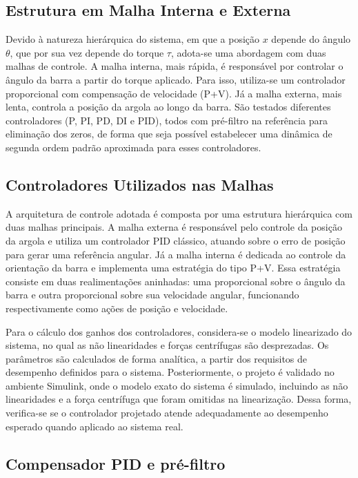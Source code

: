 \documentclass[a4paper, 12pt]{article} %
\begin{document}
\subsection{Estrutura em Malha Interna e Externa}
Devido à natureza hierárquica do sistema, em que a posição \( x \) depende do ângulo \( \theta \), que por sua vez depende do torque \( \tau \), adota-se uma abordagem com duas malhas de controle. A malha interna, mais rápida, é responsável por controlar o ângulo da barra a partir do torque aplicado. Para isso, utiliza-se um controlador proporcional com compensação de velocidade (P+V). Já a malha externa, mais lenta, controla a posição da argola ao longo da barra. São testados diferentes controladores (P, PI, PD, DI e PID), todos com pré-filtro na referência para eliminação dos zeros, de forma que seja possível estabelecer uma dinâmica de segunda ordem padrão aproximada para esses controladores.

\subsection{Controladores Utilizados nas Malhas}

A arquitetura de controle adotada é composta por uma estrutura hierárquica com duas malhas principais. A malha externa é responsável pelo controle da posição da argola e utiliza um controlador PID clássico, atuando sobre o erro de posição para gerar uma referência angular. Já a malha interna é dedicada ao controle da orientação da barra e implementa uma estratégia do tipo P+V. Essa estratégia consiste em duas realimentações aninhadas: uma proporcional sobre o ângulo da barra e outra proporcional sobre sua velocidade angular, funcionando respectivamente como ações de posição e velocidade.

Para o cálculo dos ganhos dos controladores, considera-se o modelo linearizado do sistema, no qual as não linearidades e forças centrífugas são desprezadas. Os parâmetros são calculados de forma analítica, a partir dos requisitos de desempenho definidos para o sistema. Posteriormente, o projeto é validado no ambiente Simulink, onde o modelo exato do sistema é simulado, incluindo as não linearidades e a força centrífuga que foram omitidas na linearização. Dessa forma, verifica-se se o controlador projetado atende adequadamente ao desempenho esperado quando aplicado ao sistema real.

\subsection{Compensador PID e pré-filtro}
\end{document}
